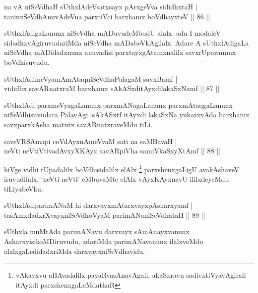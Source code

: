 \begin{shl}
na vA niSeVdhaH sUthxlAdeVsatxsayx pArxgeVva sididhxtaH |\\
taninxSeVdhAnuvAdeVna parxtiVci barxhamx boVdhayxteV \hfill || 86 ||
\end{shl}

\begin{artha}
sUthxlAdigaLanunx niSeVdha mADuvudeMbudU alalx. adu I modaleV sidadhxvAgiruvudariMda niSeVdha mADabeVkAgilalx. Adare A sUthxlAdigaLa niSeVdha mADidadxnunx anuvadisi parxtayxgAtamxnalilx savxrUpavanunx boVdhisuvudu.
\end{artha}

\begin{shl}
sUthxlAdimeVyamAmAtaqniSeVdhaPalagaM savxBamf |\\
vididhx savARnatxraM barxhamx sAkASxditAyxdilakaSxNamf \hfill || 87 ||
\end{shl}

\begin{artha}
sUthxlAdi parxmeVyagaLanunx-parxmANagaLanunx parxmAtaqgaLanunx niSeVdhisuvudara PalavAgi `sAkASxtf itAyxdi lakaSxNa yukatxvAda barxhamx savxparxkAsha matutx savARnatxraveMdu tiLi.
\end{artha}

\begin{shl}
saveVRSAmapi coVdAyxnAmeVvaM sati na saMBavaH |\\
neVti neVtiVtivadAvxyXKAyx savAR\s piVha samiVkaSxyXtAmf \hfill || 88 ||
\end{shl}

\begin{artha}
hiVge vidhi rUpadalilx boVdhisidalilx elAlx \footnote{vAkayxvu aBAvadalilx payaRvasAnavAgali, akaSxravu sadivxtiVyavAgirali itAyxdi parxshenxgaLeMdathaR} parxshenxgaLigU avakAshaveV iruvudilalx, `neVti neVti' eMbuvaMte elAlx vAyxKAyxnavU ililxdeyeMdu tiLiyabeVku.
\end{artha}%

\begin{shl}
sUthxlAdiparimANaM hi darxvayxmAtarxvayxpAsharxyamf |\\
tasAmxdadxrXvayxniSeVdhoV\s yaM parimANaniSeVdhataH \hfill || 89 ||
\end{shl}

\begin{artha}
sUthxla muMtAda parimANavu darxvayx sAmAnayxvanunx AsharxyisikoMDiruvudu, adariMda parimANavanunx ilalxveMdu alalxgaLedidadxriMda darxvayxniSeVdhavidu.
\end{artha}

